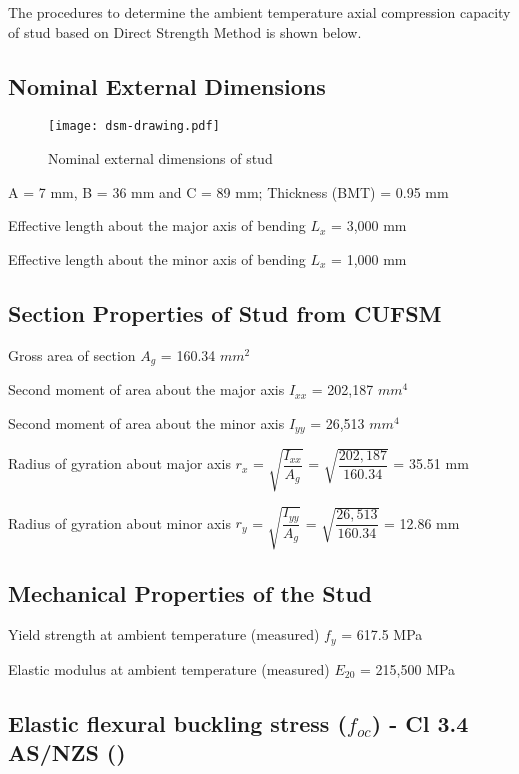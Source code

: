 \setlength{\parindent}{0em}

The procedures to determine the ambient temperature axial compression capacity of stud based on Direct Strength Method is shown below.

\subsection*{Nominal External Dimensions}

\begin{figure}[!htbp]
    \centering
    \texttt{[image: dsm-drawing.pdf]}
    \caption{Nominal external dimensions of stud}
    \label{fig:dsm-drawing}
\end{figure}

A = 7 mm, B = 36 mm and C = 89 mm; Thickness (BMT) = 0.95 mm

Effective length about the major axis of bending $L_x$ = 3,000 mm

Effective length about the minor axis of bending $L_x$ = 1,000 mm

\subsection*{Section Properties of Stud from CUFSM}

Gross area of section $A_g$ = 160.34 $mm^2$

Second moment of area about the major axis $I_{xx}$ = 202,187 $mm^4$

Second moment of area about the minor axis $I_{yy}$ = 26,513 $mm^4$

Radius of gyration about major axis $r_x$ = $\sqrt{\dfrac{I_{xx}}{A_g}}$ = $\sqrt{\dfrac{202,187}{160.34}}$ = 35.51 mm

Radius of gyration about minor axis $r_y$ = $\sqrt{\dfrac{I_{yy}}{A_g}}$ = $\sqrt{\dfrac{26,513}{160.34}}$ = 12.86 mm

\subsection*{Mechanical Properties of the Stud}

Yield strength at ambient temperature (measured) $f_y$ = 617.5 MPa 

Elastic modulus at ambient temperature (measured) $E_20$ = 215,500 MPa

\subsection*{Elastic flexural buckling stress ($f_{oc}$) - Cl 3.4 AS/NZS (\citet{ASNZ4600})}


